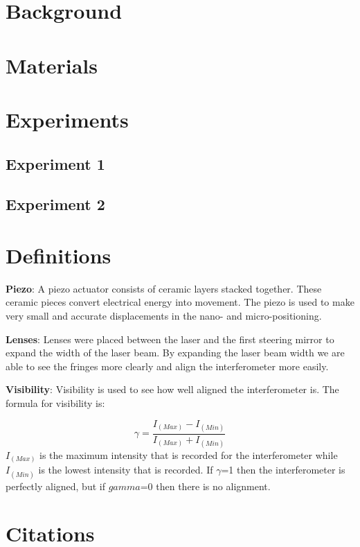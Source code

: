 \documentclass[twocolumn]{article}
\begin{document}
  


 
 \tableofcontents



\section{Background}  

\section{Materials}
		

		
\section{Experiments}
	\subsection{Experiment 1}
	\subsection{Experiment 2}
\appendix
\section{Definitions}

\textbf{Piezo}:
    A piezo actuator consists of ceramic layers stacked together. These ceramic pieces convert electrical energy into movement. The piezo is used to make very small and accurate displacements in the nano- and micro-positioning.

\textbf{Lenses}:
    Lenses were placed between the laser and the first steering mirror to expand the width of the laser beam. By expanding the laser beam width we are able to see the fringes more clearly and align the interferometer more easily.
    
%
\textbf{Visibility}:
    Visibility is used to see how well aligned the interferometer is. The formula for visibility is:

     \begin{equation}\label{eqn:Visibility}  
        \gamma= \frac{I_(Max) - I_(Min)}{I_(Max) + I_(Min)}
     \end{equation}    
%
$I_(Max)$ is the maximum intensity that is recorded for the interferometer while $I_(Min)$ is the lowest intensity that is recorded.  If $\gamma$=1 then the interferometer is perfectly aligned, but if $gamma$=0 then there is no alignment. 

\section{Citations}

 
\end{document}
